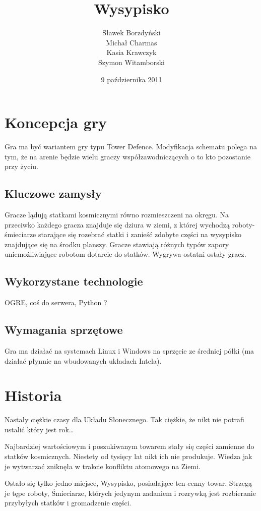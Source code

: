 \documentclass[a4paper,12pt]{report}
\title{Wysypisko}
\author{Sławek Borzdyński\\Michał Charmas\\Kasia Krawczyk\\Szymon Witamborski}
\date{9 października 2011}
\begin{document}
\maketitle
\tableofcontents
\chapter{Koncepcja gry}

Gra ma być wariantem gry typu Tower Defence. Modyfikacja schematu polega na tym, że na arenie będzie wielu graczy współzawodniczących o to kto pozostanie przy życiu.

\section{Kluczowe zamysły}

Gracze lądują statkami kosmicznymi równo rozmieszczeni na okręgu. Na przeciwko każdego gracza znajduje się dziura w ziemi, z której wychodzą roboty-śmieciarze starające się rozebrać statki i zanieść zdobyte części na wysypisko znajdujące się na środku planszy. Gracze stawiają różnych typów zapory uniemożliwiające robotom dotarcie do statków. Wygrywa ostatni ostały gracz.

\section{Wykorzystane technologie}

OGRE, coś do serwera, Python ?

\section{Wymagania sprzętowe}

Gra ma działać na systemach Linux i Windows na sprzęcie ze średniej półki (ma działać płynnie na wbudowanych układach Intela).

\chapter{Historia}

Nastały ciężkie czasy dla Układu Słonecznego. Tak ciężkie, że nikt nie potrafi ustalić który jest rok\ldots

Najbardziej wartościowym i poszukiwanym towarem stały się części zamienne do statków kosmicznych. Niestety od tysięcy lat nikt ich nie produkuje. Wiedza jak je wytwarzać zniknęła w trakcie konfliktu atomowego na Ziemi.

Ostało się tylko jedno miejsce, Wysypisko, posiadające ten cenny towar. Strzegą je tępe roboty, Śmieciarze, których jedynym zadaniem i rozrywką jest rozbieranie przybyłych statków i gromadzenie części.
\end{document}
